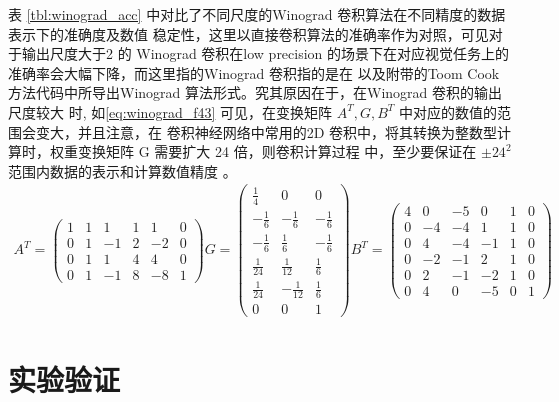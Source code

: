 表 \ref{tbl:winograd_acc} 中对比了不同尺度的Winograd 卷积算法在不同精度的数据表示下的准确度及数值
稳定性，这里以直接卷积算法的准确率作为对照，可见对于输出尺度大于2 的 Winograd 卷积在low precision 
的场景下在对应视觉任务上的准确率会大幅下降，而这里指的Winograd 卷积指的是在 \cite{Lavin2015FastAF}
以及附带的Toom Cook 方法代码中所导出Winograd 算法形式。究其原因在于，在Winograd 卷积的输出尺度较大
时, 如\ref{eq:winograd_f43} 可见，在变换矩阵 $A^T, G, B^T$ 中对应的数值的范围会变大，并且注意，在
卷积神经网络中常用的2D 卷积中，将其转换为整数型计算时，权重变换矩阵 G 需要扩大 24 倍，则卷积计算过程
中，至少要保证在 $\pm24^2$ 范围内数据的表示和计算数值精度 。
\begin{align}
\label{eq:winograd_f43}
  A^T = 
  \begin{pmatrix}
      1 & 1 & 1 &  1 &  1 &  0\\
      0 & 1 & -1&  2 &  -2&  0\\
      0 & 1 & 1 &  4 &  4 &  0\\
      0 & 1 & -1&  8 &  -8&  1
  \end{pmatrix}
  G = 
  \begin{pmatrix}
    \frac{1}{4} & 0 & 0 \\
    -\frac{1}{6} & -\frac{1}{6} & -\frac{1}{6} \\
    -\frac{1}{6} & \frac{1}{6} & -\frac{1}{6} \\
    \frac{1}{24} & \frac{1}{12} & \frac{1}{6} \\
    \frac{1}{24} & -\frac{1}{12} & \frac{1}{6} \\
    0 & 0 & 1
  \end{pmatrix}
  B^T =
  \begin{pmatrix}
    4  & 0 &  -5 & 0  &  1&  0\\
    0  & -4&  -4 & 1  &  1&  0\\
    0  & 4 &  -4 & -1 &  1&  0\\
    0  & -2&  -1 & 2  &  1&  0\\
    0  & 2 &  -1 & -2 &  1&  0\\
    0  & 4 &  0  & -5 &  0&  1
  \end{pmatrix}
\end{align}

\section{实验验证}

